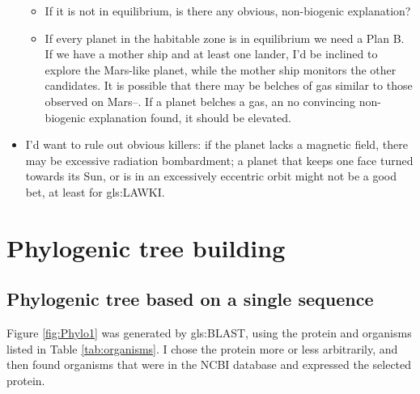 \documentclass[]{article}
\begin{document}
\begin{itemize}
\begin{itemize}
		\item If it is not in equilibrium, is there any obvious, non-biogenic explanation?
		\item If every planet in the habitable zone is in equilibrium we need a Plan B. If we have a mother ship and at least one lander, I'd be inclined to explore the Mars-like planet, while the mother ship monitors the other candidates. It is possible that there may be belches of gas similar to those observed on Mars--\cite{nasa2019curiosity}. If a planet belches a gas, an no convincing non-biogenic explanation found, it should be elevated. 
	\end{itemize}
	\item I'd want to rule out obvious killers: if the planet lacks a magnetic field, there may be excessive radiation bombardment; a planet that keeps one face turned towards its Sun, or is in an excessively eccentric orbit might not be a good bet, at least for \gls{gls:LAWKI}.  
\end{itemize}

\section{Phylogenic tree building}

\subsection{Phylogenic tree based on a single sequence}

Figure \ref{fig:Phylo1} was generated by \gls{gls:BLAST}, using the protein and organisms listed in Table \ref{tab:organisms}. I chose the protein more or less arbitrarily, and then found organisms that were in the NCBI database and expressed the selected protein.
\end{document}
